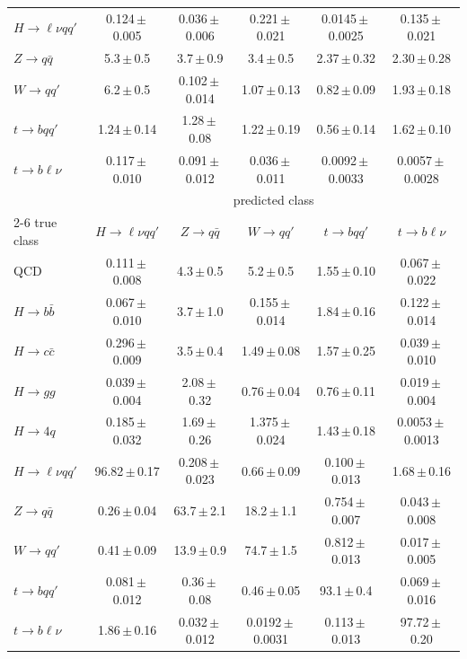 \begin{landscape}
{\begin{center}
\begin{minipage}{\linewidth}
\begin{tabular*}{\linewidth}{@{\extracolsep{\fill}}lccccc@{}}
$H\to \ell\nu qq'$ & 0.124\,$\pm$\,0.005 & 0.036\,$\pm$\,0.006 & 0.221\,$\pm$\,0.021 & 0.0145\,$\pm$\,0.0025 & 0.135\,$\pm$\,0.021 \\
$Z\to q\bar q$ & 5.3\,$\pm$\,0.5 & 3.7\,$\pm$\,0.9 & 3.4\,$\pm$\,0.5 & 2.37\,$\pm$\,0.32 & 2.30\,$\pm$\,0.28 \\
$W\to qq'$ & 6.2\,$\pm$\,0.5 & 0.102\,$\pm$\,0.014 & 1.07\,$\pm$\,0.13 & 0.82\,$\pm$\,0.09 & 1.93\,$\pm$\,0.18 \\
$t\to bqq'$ & 1.24\,$\pm$\,0.14 & 1.28\,$\pm$\,0.08 & 1.22\,$\pm$\,0.19 & 0.56\,$\pm$\,0.14 & 1.62\,$\pm$\,0.10 \\
$t\to b\ell\nu$ & 0.117\,$\pm$\,0.010 & 0.091\,$\pm$\,0.012 & 0.036\,$\pm$\,0.011 & 0.0092\,$\pm$\,0.0033 & 0.0057\,$\pm$\,0.0028 \\
\midrule
 & \multicolumn{5}{c}{predicted class} \\
\cmidrule(lr){2-6}
true class & $H\to \ell\nu qq'$ & $Z\to q\bar q$ & $W\to qq'$ & $t\to bqq'$ & $t\to b\ell\nu$ \\
\midrule
QCD & 0.111\,$\pm$\,0.008 & 4.3\,$\pm$\,0.5 & 5.2\,$\pm$\,0.5 & 1.55\,$\pm$\,0.10 & 0.067\,$\pm$\,0.022 \\
$H\to b\bar b$ & 0.067\,$\pm$\,0.010 & 3.7\,$\pm$\,1.0 & 0.155\,$\pm$\,0.014 & 1.84\,$\pm$\,0.16 & 0.122\,$\pm$\,0.014 \\
$H\to c\bar c$ & 0.296\,$\pm$\,0.009 & 3.5\,$\pm$\,0.4 & 1.49\,$\pm$\,0.08 & 1.57\,$\pm$\,0.25 & 0.039\,$\pm$\,0.010 \\
$H\to gg$ & 0.039\,$\pm$\,0.004 & 2.08\,$\pm$\,0.32 & 0.76\,$\pm$\,0.04 & 0.76\,$\pm$\,0.11 & 0.019\,$\pm$\,0.004 \\
$H\to 4q$ & 0.185\,$\pm$\,0.032 & 1.69\,$\pm$\,0.26 & 1.375\,$\pm$\,0.024 & 1.43\,$\pm$\,0.18 & 0.0053\,$\pm$\,0.0013 \\
$H\to \ell\nu qq'$ & 96.82\,$\pm$\,0.17 & 0.208\,$\pm$\,0.023 & 0.66\,$\pm$\,0.09 & 0.100\,$\pm$\,0.013 & 1.68\,$\pm$\,0.16 \\
$Z\to q\bar q$ & 0.26\,$\pm$\,0.04 & 63.7\,$\pm$\,2.1 & 18.2\,$\pm$\,1.1 & 0.754\,$\pm$\,0.007 & 0.043\,$\pm$\,0.008 \\
$W\to qq'$ & 0.41\,$\pm$\,0.09 & 13.9\,$\pm$\,0.9 & 74.7\,$\pm$\,1.5 & 0.812\,$\pm$\,0.013 & 0.017\,$\pm$\,0.005 \\
$t\to bqq'$ & 0.081\,$\pm$\,0.012 & 0.36\,$\pm$\,0.08 & 0.46\,$\pm$\,0.05 & 93.1\,$\pm$\,0.4 & 0.069\,$\pm$\,0.016 \\
$t\to b\ell\nu$ & 1.86\,$\pm$\,0.16 & 0.032\,$\pm$\,0.012 & 0.0192\,$\pm$\,0.0031 & 0.113\,$\pm$\,0.013 & 97.72\,$\pm$\,0.20 \\
\bottomrule
\end{tabular*}
\end{minipage}
\end{center}
}
\end{landscape}

